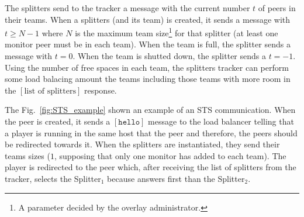The splitters send to the tracker a message with the current number
$t$ of peers in their teams. When a splitters (and its team) is
created, it sends a message with $t \geq N-1$ where $N$ is the maximum
team size\footnote{A parameter decided by the overlay administrator.}
for that splitter (at least one monitor peer must be in each
team). When the team is full, the splitter sends a message with
$t=0$. When the team is shutted down, the splitter sends a
$t=-1$. Using the number of free spaces in each team, the splitters
tracker can perform some load balacing amount the teams including
those teams with more room in the $[\text{list of splitters}]$
response.

\begin{figure*}
\caption{Timeline example of an STS interaction.\label{fig:STS_example}}
\end{figure*}

The Fig.~\ref{fig:STS_example} shown an example of an STS
communication. When the peer is created, it sends a $[\mathtt{hello}]$
message to the load balancer telling that a player is running in the
same host that the peer and therefore, the peers should be redirected
towards it. When the splitters are instantiated, they send their teams
sizes ($1$, supposing that only one monitor has added to each
team). The player is redirected to the peer which, after receiving the
list of splitters from the tracker, selects the Splitter$_1$ because
answers first than the Splitter$_2$.

